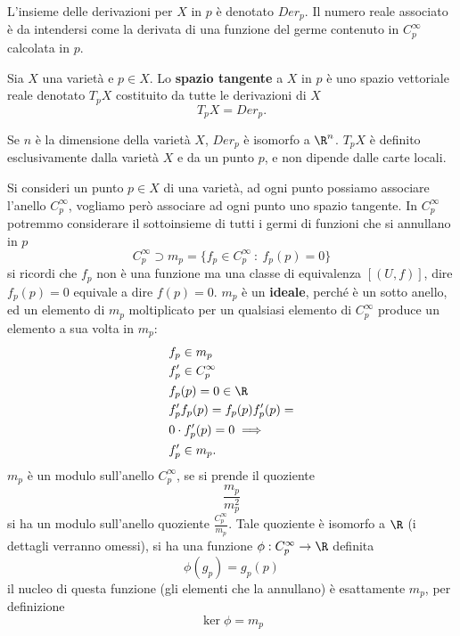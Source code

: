 \documentclass[10pt, letterpaper]{report}
\begin{document}
L'insieme delle derivazioni per $X$ in $p$ è denotato $Der_p$. Il numero reale associato è da intendersi come la derivata di una funzione del germe contenuto in $C^\infty_p$ calcolata in $p$.
\begin{definizione}
     Sia $X$ una varietà e $p\in X$. Lo \textbf{spazio tangente} a $X$ in $p$ è uno spazio vettoriale reale denotato $T_pX$ costituito da tutte le derivazioni di $X$\begin{equation}
        T_pX=Der_p.
     \end{equation}
\end{definizione}
Se $n$ è la dimensione della varietà $X$, $Der_p$ è isomorfo a $\R^n$. $T_pX$ è definito esclusivamente dalla varietà $X$ e da un punto $p$, e non dipende dalle carte locali.\bigskip

Si consideri un punto $p\in X$ di una varietà, ad ogni punto possiamo associare l'anello $C_p^\infty$, vogliamo però associare ad ogni punto uno spazio tangente. In $C_p^\infty$ potremmo considerare il sottoinsieme di  tutti i germi di funzioni che si annullano in $p$\begin{equation}
    C_p^\infty \supset m_p = \{f_p\in C_p^\infty \ :  \ f_p(p)=0 \}
\end{equation}
si ricordi che $f_p$ non è una funzione ma una classe di equivalenza $[(U,f)]$, dire $f_p(p)=0$ equivale a dire $f(p)=0$. $m_p$ è un \textbf{ideale}, perché è un sotto anello, ed un elemento di $m_p$ moltiplicato per un qualsiasi elemento di $ C_p^\infty$ produce un elemento a sua volta in  $m_p$:\begin{align}
    &f_p\in m_p\\ 
    &f'_p\in C_p^\infty \\ 
    &f_p(p)=0\in \R\\
    &f'_pf_p(p) =f_p(p)f'_p(p)=\\& 0\cdot f'_p(p)=0\implies\\
   & f'_p\in m_p.
\end{align}
$m_p$ è un modulo sull'anello $C_p^\infty$, se si prende il quoziente \begin{equation}
    \frac{m_p}{m_p^2}
\end{equation}
si ha un modulo sull'anello quoziente $\frac{C_p^\infty}{m_p}$. Tale quoziente è isomorfo a $\R$ (i dettagli verranno omessi), si ha una funzione $\phi:C_p^\infty\rightarrow \R$ definita\begin{equation}
    \phi(g_p)=g_p(p)
\end{equation}
il nucleo di questa funzione (gli elementi che la annullano) è esattamente $m_p$, per definizione\begin{equation}
    \ker\phi=m_p 
\end{equation} 
\end{document}
